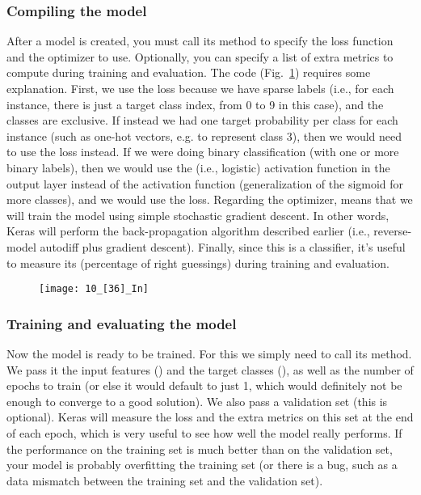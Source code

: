 \subsubsection{Compiling the model}
After a model is created, you must call its  method to specify the loss function and the optimizer to use. Optionally, you can specify a list of extra metrics to compute during training and evaluation. The code (Fig.~\ref{10_[36]_In}) requires some explanation. First, we use the  loss because we have sparse labels (i.e., for each instance, there is just a target class index, from 0 to 9 in this case), and the classes are exclusive. If instead we had one target probability per class for each instance (such as one-hot vectors, e.g. \jupytercode{[0., 0., 0., 1., 0., 0., 0., 0., 0., 0.]} to represent class 3), then we would need to use the  loss instead. If we were doing binary classification (with one or more binary labels), then we would use the  (i.e., logistic) activation function in the output layer instead of the  activation function (generalization of the sigmoid for more classes), and we would use the  loss. Regarding the optimizer,  means that we will train the model using simple stochastic gradient descent. In other words, Keras will perform the back-propagation algorithm described earlier (i.e., reverse-model autodiff plus gradient descent). Finally, since this is a classifier, it's useful to measure its  (percentage of right guessings) during training and evaluation.
\begin{figure}[h!t]
\centering
\texttt{[image: 10\_[36]\_In]}
\caption{}\label{10_[36]_In}
\end{figure}
\subsubsection{Training and evaluating the model}
Now the model is ready to be trained. For this we simply need to call its  method. We pass it the input features () and the target classes (), as well as the number of epochs to train (or else it would default to just 1, which would definitely not be enough to converge to a good solution). We also pass a validation set (this is optional). Keras will measure the loss and the extra metrics on this set at the end of each epoch, which is very useful to see how well the model really performs. If the performance on the training set is much better than on the validation set, your model is probably overfitting the training set (or there is a bug, such as a data mismatch between the training set and the validation set).

